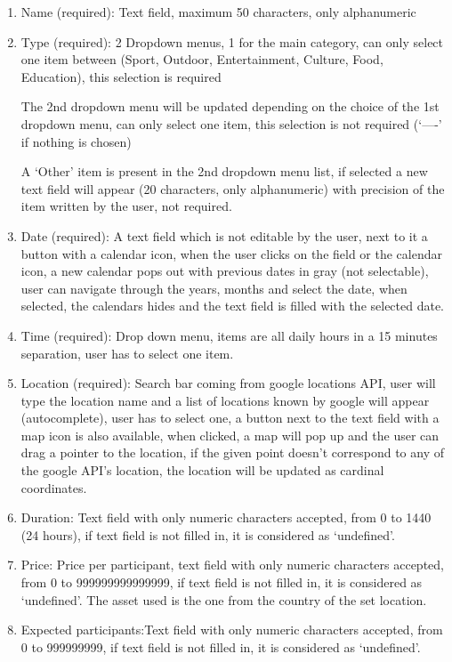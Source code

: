 \documentclass[conference]{IEEEtran}
\begin{document}
\begin{enumerate}

\item Name (required): Text field, maximum 50 characters, only alphanumeric
\item Type (required): 2 Dropdown menus, 1 for the main category, can only select one item between (Sport, Outdoor, Entertainment, Culture, Food, Education), this selection is required

The 2nd dropdown menu will be updated depending on the choice of the 1st dropdown menu, can only select one item, this selection is not required (‘----’ if nothing is chosen)

A ‘Other’ item is present in the 2nd dropdown menu list, if selected a new text field will appear (20 characters, only alphanumeric) with precision of the item written by the user, not required.
\item Date (required): A text field which is not editable by the user, next to it a button with a calendar icon, when the user clicks on the field or the calendar icon, a new calendar pops out with previous dates in gray (not selectable), user can navigate through the years, months and select the date, when selected, the calendars hides and the text field is filled with the selected date.
\item Time (required): Drop down menu, items are all daily hours in a 15 minutes separation, user has to select one item.
\item Location (required): Search bar coming from google locations API, user will type the location name and a list of locations known by google will appear (autocomplete), user has to select one, a button next to the text field with a map icon is also available, when clicked, a map will pop up and the user can drag a pointer to the location, if the given point doesn’t correspond to any of the google API’s location, the location will be updated as cardinal coordinates.
\item Duration: Text field with only numeric characters accepted, from 0 to 1440 (24 hours), if text field is not filled in, it is considered as ‘undefined’.
\item Price: Price per participant, text field with only numeric characters accepted, from 0 to 999999999999999, if text field is not filled in, it is considered as ‘undefined’. The asset used is the one from the country of the set location.
\item Expected participants:Text field with only numeric characters accepted, from 0 to 999999999, if text field is not filled in, it is considered as ‘undefined’.

\end{enumerate}
\end{document}
